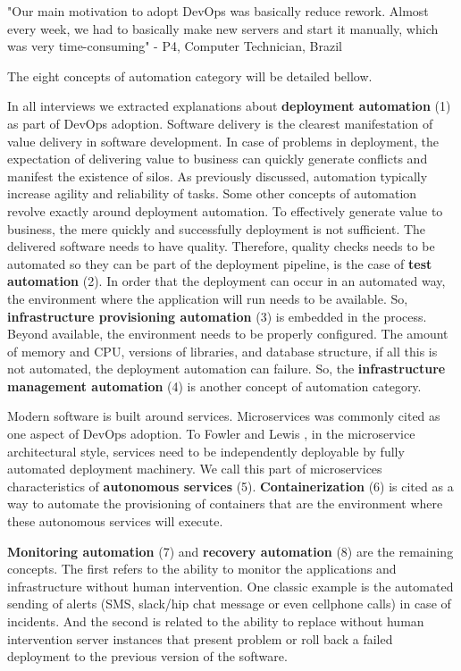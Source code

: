 "Our main motivation to adopt DevOps was basically reduce rework. Almost every
week, we had to basically make new servers and start it manually, which was
very time-consuming" - P4, Computer Technician, Brazil

The eight concepts of automation category will be detailed bellow.

In all interviews we extracted explanations about \textbf{deployment
automation} (1) as part of DevOps adoption. Software delivery is the clearest
manifestation of value delivery in software development. In case of problems
in deployment, the expectation of delivering value to business can quickly
generate conflicts and manifest the existence of silos. As previously discussed,
automation typically increase agility and reliability of tasks. Some other
concepts of automation revolve exactly around deployment automation. To
effectively generate value to business, the mere quickly and successfully
deployment is not sufficient. The delivered software needs to have quality.
Therefore, quality checks needs to be automated so they can be part of the
deployment pipeline, is the case of \textbf{test automation} (2). In order
that the deployment can occur in an automated way, the environment where the
application will run needs to be available. So, \textbf{infrastructure
provisioning automation} (3) is embedded in the process. Beyond available,
the environment needs to be properly configured. The amount of memory and CPU,
versions of libraries, and database structure, if all this is not automated,
the deployment automation can failure. So, the \textbf{infrastructure management
automation} (4) is another concept of automation category.

Modern software is built around services. Microservices  was commonly cited
as one aspect of DevOps adoption. To Fowler and Lewis
\cite{martinfowler2014microservices}, in the
microservice architectural style, services need to be independently deployable
by fully automated deployment machinery. We call this part of microservices
characteristics of \textbf{autonomous services} (5). \textbf{Containerization}
(6) is cited as a way to automate the provisioning of containers that are the
environment where these autonomous services will execute.

\textbf{Monitoring automation} (7) and \textbf{recovery automation} (8) are the
remaining concepts. The first refers to the ability to monitor the
applications and infrastructure without human intervention. One classic example
is the automated sending of alerts (SMS, slack/hip chat message or even
cellphone calls) in case of incidents. And the second is related to the ability
to replace without human intervention server instances that present problem or
roll back a failed deployment to the previous version of the software.


